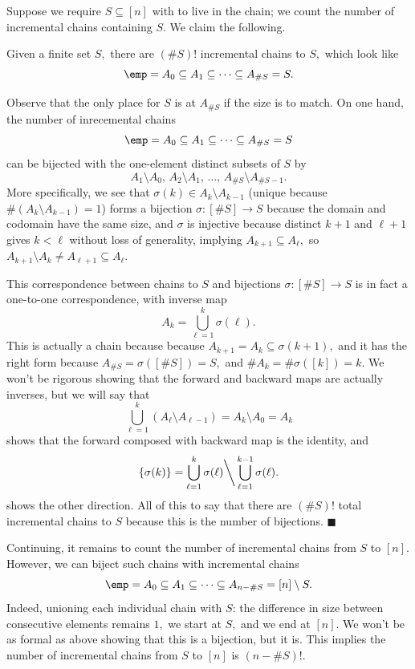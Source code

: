 Suppose we require $S\subseteq[n]$ with to live in the chain; we count the number of incremental chains containing $S.$ We claim the following.
\begin{lemma}
    Given a finite set $S,$ there are $(\#S)!$ incremental chains to $S,$ which look like
    \[\emp=A_0\subseteq A_1\subseteq\cdots\subseteq A_{\#S}=S.\]
\end{lemma}
Observe that the only place for $S$ is at $A_{\#S}$ if the size is to match. On one hand, the number of inrecemental chains
\[\emp=A_0\subseteq A_1\subseteq\cdots\subseteq A_{\#S}=S\]
can be bijected with the one-element distinct subsets of $S$ by
\[A_1\setminus A_0,\,A_2\setminus A_1,\,\ldots,\,A_{\#S}\setminus A_{\#S-1}.\]
More specifically, we see that $\sigma(k)\in A_k\setminus A_{k-1}$ (unique because $\#(A_k\setminus A_{k-1})=1$) forms a bijection $\sigma:[\#S]\to S$ because the domain and codomain have the same size, and $\sigma$ is injective because distinct $k+1$ and $\ell+1$ gives $k<\ell$ without loss of generality, implying $A_{k+1}\subseteq A_\ell,$ so $A_{k+1}\setminus A_k\ne A_{\ell+1}\subseteq A_\ell.$

This correspondence between chains to $S$ and bijections $\sigma:[\#S]\to S$ is in fact a one-to-one correspondence, with inverse map
\[A_k=\bigcup_{\ell=1}^k\sigma(\ell).\]
This is actually a chain because because $A_{k+1}=A_k\subseteq\sigma(k+1),$ and it has the right form because $A_{\#S}=\sigma([\#S])=S,$ and $\#A_k=\#\sigma([k])=k.$ We won't be rigorous showing that the forward and backward maps are actually inverses, but we will say that
\[\bigcup_{\ell=1}^k(A_\ell\setminus A_{\ell-1})=A_k\setminus A_0=A_k\]
shows that the forward composed with backward map is the identity, and
\[\{\sigma(k)\}=\bigcup_{\ell=1}^k\sigma(\ell)\bigg\backslash\bigcup_{\ell=1}^{k-1}\sigma(\ell).\]
shows the other direction. All of this to say that there are $(\#S)!$ total incremental chains to $S$ because this is the number of bijections. $\blacksquare$

Continuing, it remains to count the number of incremental chains from $S$ to $[n].$ However, we can biject such chains with incremental chains
\[\emp=A_0\subseteq A_1\subseteq\cdots\subseteq A_{n-\#S}=[n]\setminus S.\]
Indeed, unioning each individual chain with $S$: the difference in size between consecutive elements remains $1,$ we start at $S,$ and we end at $[n].$ We won't be as formal as above showing that this is a bijection, but it is. This implies the number of incremental chains from $S$ to $[n]$ is $(n-\#S)!.$

